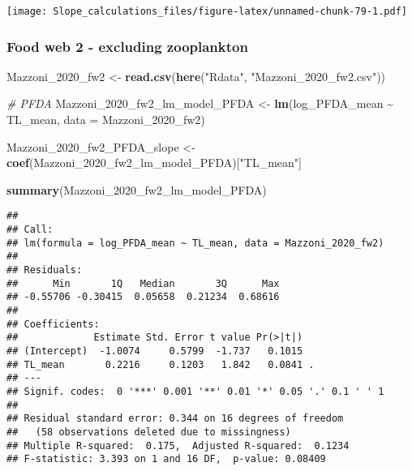 \documentclass[
]{article}
\newenvironment{Shaded}{\begin{snugshade}}{\end{snugshade}}
\newcommand{\AttributeTok}[1]{\textcolor[rgb]{0.13,0.29,0.53}{#1}}
\newcommand{\CommentTok}[1]{\textcolor[rgb]{0.56,0.35,0.01}{\textit{#1}}}
\newcommand{\FunctionTok}[1]{\textcolor[rgb]{0.13,0.29,0.53}{\textbf{#1}}}
\newcommand{\NormalTok}[1]{#1}
\newcommand{\OtherTok}[1]{\textcolor[rgb]{0.56,0.35,0.01}{#1}}
\newcommand{\SpecialCharTok}[1]{\textcolor[rgb]{0.81,0.36,0.00}{\textbf{#1}}}
\newcommand{\StringTok}[1]{\textcolor[rgb]{0.31,0.60,0.02}{#1}}
\begin{document}
\texttt{[image: Slope\_calculations\_files/figure-latex/unnamed-chunk-79-1.pdf]}

\subsubsection{Food web 2 - excluding
zooplankton}\label{food-web-2---excluding-zooplankton}

\begin{Shaded}
\begin{Highlighting}[]
\NormalTok{Mazzoni\_2020\_fw2 }\OtherTok{\textless{}{-}} \FunctionTok{read.csv}\NormalTok{(}\FunctionTok{here}\NormalTok{(}\StringTok{"Rdata"}\NormalTok{, }\StringTok{"Mazzoni\_2020\_fw2.csv"}\NormalTok{))}

\CommentTok{\# PFDA}
\NormalTok{Mazzoni\_2020\_fw2\_lm\_model\_PFDA }\OtherTok{\textless{}{-}} \FunctionTok{lm}\NormalTok{(log\_PFDA\_mean }\SpecialCharTok{\textasciitilde{}}\NormalTok{ TL\_mean,}
                                      \AttributeTok{data =}\NormalTok{ Mazzoni\_2020\_fw2)}

\NormalTok{Mazzoni\_2020\_fw2\_PFDA\_slope }\OtherTok{\textless{}{-}} \FunctionTok{coef}\NormalTok{(Mazzoni\_2020\_fw2\_lm\_model\_PFDA)[}\StringTok{"TL\_mean"}\NormalTok{]}

\FunctionTok{summary}\NormalTok{(Mazzoni\_2020\_fw2\_lm\_model\_PFDA)}
\end{Highlighting}
\end{Shaded}

\begin{verbatim}
## 
## Call:
## lm(formula = log_PFDA_mean ~ TL_mean, data = Mazzoni_2020_fw2)
## 
## Residuals:
##      Min       1Q   Median       3Q      Max 
## -0.55706 -0.30415  0.05658  0.21234  0.68616 
## 
## Coefficients:
##             Estimate Std. Error t value Pr(>|t|)  
## (Intercept)  -1.0074     0.5799  -1.737   0.1015  
## TL_mean       0.2216     0.1203   1.842   0.0841 .
## ---
## Signif. codes:  0 '***' 0.001 '**' 0.01 '*' 0.05 '.' 0.1 ' ' 1
## 
## Residual standard error: 0.344 on 16 degrees of freedom
##   (58 observations deleted due to missingness)
## Multiple R-squared:  0.175,  Adjusted R-squared:  0.1234 
## F-statistic: 3.393 on 1 and 16 DF,  p-value: 0.08409
\end{verbatim}
\end{document}
